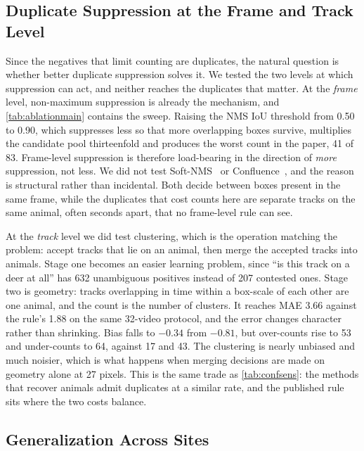 \subsection{Duplicate Suppression at the Frame and Track Level}
\label{sec:nms}

Since the negatives that limit counting are duplicates, the natural question is whether
better duplicate suppression solves it. We tested the two levels at which suppression can
act, and neither reaches the duplicates that matter. At the \emph{frame} level,
non-maximum suppression is already the mechanism, and \cref{tab:ablationmain} contains the
sweep. Raising the NMS IoU threshold from 0.50 to 0.90, which suppresses less so that more
overlapping boxes survive, multiplies the candidate pool thirteenfold and produces the worst
count in the paper, 41 of 83. Frame-level suppression is therefore load-bearing in the
direction of \emph{more} suppression, not less. We did not test
Soft-NMS~\cite{bodla2017softnms} or Confluence~\cite{shuai2021confluence}, and the reason
is structural rather than incidental. Both decide between boxes present in the same frame,
while the duplicates that cost counts here are separate tracks on the same animal, often
seconds apart, that no frame-level rule can see.

At the \emph{track} level we did test clustering, which is the operation matching the
problem: accept tracks that lie on an animal, then merge the accepted tracks into animals.
Stage one becomes an easier learning problem, since ``is this track on a deer at all'' has
632 unambiguous positives instead of 207 contested ones. Stage two is geometry: tracks
overlapping in time within a box-scale of each other are one animal, and the count is the
number of clusters. It reaches MAE 3.66 against the rule's 1.88 on the same 32-video
protocol, and the error changes character rather than shrinking. Bias falls to $-0.34$
from $-0.81$, but over-counts rise to 53 and under-counts to 64, against 17 and 43. The
clustering is nearly unbiased and much noisier, which is what happens when merging
decisions are made on geometry alone at 27 pixels. This is the same trade as
\cref{tab:confsens}: the methods that recover animals admit duplicates at a similar rate,
and the published rule sits where the two costs balance.

\subsection{Generalization Across Sites}
\label{sec:loso}

